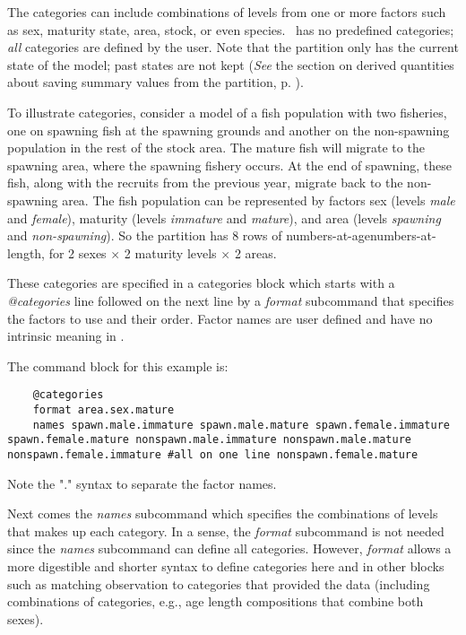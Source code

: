 The categories can include combinations of levels from one or more factors such as sex, maturity state, area, stock, or even species. \CNAME\ has no predefined categories; \emph{all} categories are defined by the user. Note that the partition only has the current state of the model; past states are not kept (\textit{See} the section on derived quantities about saving summary values from the partition, p. \pageref{sec:DerivedQuantity}).

To illustrate categories, consider a model of a fish population with two fisheries, one on spawning fish at the spawning grounds and another on the non-spawning population in the rest of the stock area. The mature fish will migrate to the spawning area, where the spawning fishery occurs. At the end of spawning, these fish, along with the recruits from the previous year, migrate back to the non-spawning area. The fish population can be represented  by factors sex (levels \textit{male} and \textit{female}), maturity (levels \textit{immature} and \textit{mature}), and area (levels \textit{spawning} and \textit{non-spawning}). So the partition has 8 rows of \ifAgeBased numbers-at-age\else numbers-at-length\fi, for 2 sexes $\times$ 2 maturity levels $\times$ 2 areas.

These categories are specified in a categories block which starts with a \textit{@categories} line followed on the next line by a \textit{format} subcommand that specifies the factors to use and their order. Factor names are user defined and have no intrinsic meaning in \CNAME.

The command block for this example is:

{\small{\begin{lstlisting}
	@categories
	format area.sex.mature
	names spawn.male.immature spawn.male.mature spawn.female.immature spawn.female.mature nonspawn.male.immature nonspawn.male.mature nonspawn.female.immature #all on one line nonspawn.female.mature
\end{lstlisting}}}  %

Note the "." syntax to separate the factor names.

Next comes the \textit{names} subcommand which specifies the combinations of levels that makes up each category. In a sense, the \textit{format} subcommand is not needed since the \textit{names} subcommand can define all categories. However, \textit{format} allows a more  digestible and shorter syntax to define categories here and in other blocks such as matching observation to categories that provided the data (including combinations of categories, e.g., \ifAgeBased age \else length \fi compositions that combine both sexes).

